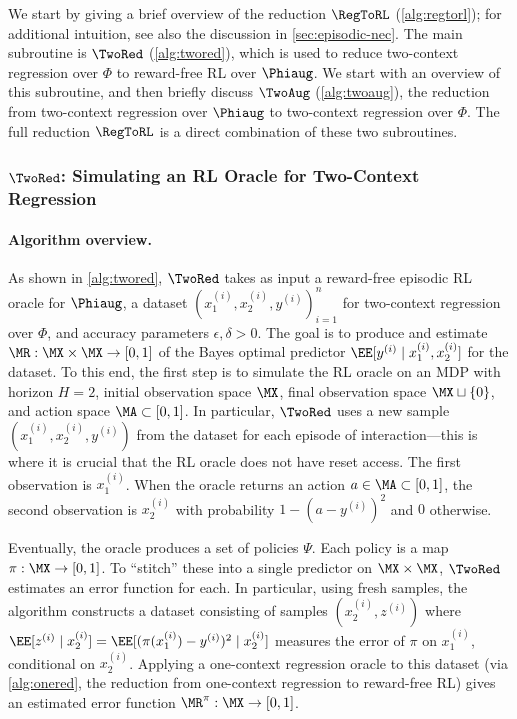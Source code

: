 We start by giving a brief overview of the reduction $\RegToRL$ (\cref{alg:regtorl}); for additional intuition, see also the discussion in \cref{sec:episodic-nec}. The main subroutine is $\TwoRed$ (\cref{alg:twored}), which is used to reduce two-context regression over $\Phi$ to reward-free RL over $\Phiaug$. We start with an overview of this subroutine, and then briefly discuss $\TwoAug$ (\cref{alg:twoaug}), the reduction from two-context regression over $\Phiaug$ to two-context regression over $\Phi$. The full reduction $\RegToRL$ is a direct combination of these two subroutines.



\subsubsection{$\TwoRed$: Simulating an RL Oracle for Two-Context Regression}

\paragraph{Algorithm overview.} As shown in \cref{alg:twored}, $\TwoRed$ takes as input a reward-free episodic RL oracle for $\Phiaug$, a dataset $(x_1^{(i)},x_2^{(i)},y^{(i)})_{i=1}^n$ for two-context regression over $\Phi$, and accuracy parameters $\epsilon,\delta>0$. The goal is to produce and estimate $\MR:\MX\times\MX\to[0,1]$ of the Bayes optimal predictor $\EE[y^{(i)}\mid{}x_1^{(i)},x_2^{(i)}]$ for the dataset. To this end, the first step is to simulate the RL oracle on an MDP with horizon $H=2$, initial observation space $\MX$, final observation space $\MX\sqcup\{0\}$, and action space $\MA \subset [0,1]$. In particular, $\TwoRed$ uses a new sample $(x_1^{(i)},x_2^{(i)},y^{(i)})$ from the dataset for each episode of interaction---this is where it is crucial that the RL oracle does not have reset access. The first observation is $x_1^{(i)}$. When the oracle returns an action $a \in \MA \subset [0,1]$, the second observation is $x_2^{(i)}$ with probability $1-(a-y^{(i)})^2$ and $0$ otherwise.



Eventually, the oracle produces a set of policies $\Psi$. Each policy is a map $\pi: \MX\to[0,1]$. To ``stitch'' these into a single predictor on $\MX\times\MX$, $\TwoRed$ estimates an error function for each. In particular, using fresh samples, the algorithm constructs a dataset consisting of samples $(x_2^{(i)}, z^{(i)})$ where $\EE[z^{(i)}\mid{} x_2^{(i)}] = \EE[(\pi(x_1^{(i)})-y^{(i)})^2\mid{} x_2^{(i)}]$ measures the error of $\pi$ on $x_1^{(i)}$, conditional on $x_2^{(i)}$. Applying a one-context regression oracle to this dataset (via \cref{alg:onered}, the reduction from one-context regression to reward-free RL) gives an estimated error function $\MR^\pi:\MX\to[0,1]$. 

